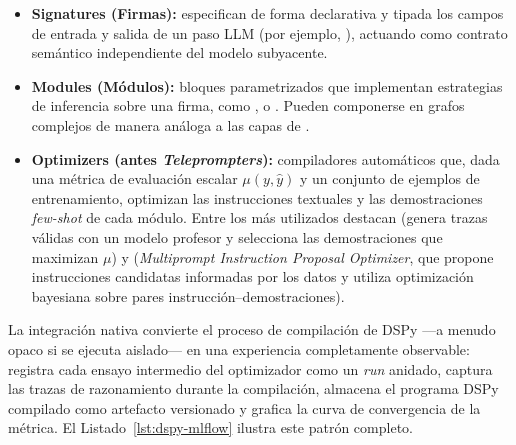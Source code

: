 \begin{itemize}
  \item \textbf{Signatures (Firmas):} especifican de forma declarativa y tipada los campos de entrada y salida de un paso LLM (por ejemplo, ), actuando como contrato semántico independiente del modelo subyacente.
  \item \textbf{Modules (Módulos):} bloques parametrizados que implementan estrategias de inferencia sobre una firma, como ,  o . Pueden componerse en grafos complejos de manera análoga a las capas de .
  \item \textbf{Optimizers (antes \textit{Teleprompters}):} compiladores automáticos que, dada una métrica de evaluación escalar $\mu(y, \hat{y})$ y un conjunto de ejemplos de entrenamiento, optimizan las instrucciones textuales y las demostraciones \textit{few-shot} de cada módulo. Entre los más utilizados destacan  (genera trazas válidas con un modelo profesor y selecciona las demostraciones que maximizan $\mu$) y  (\textit{Multiprompt Instruction Proposal Optimizer}, que propone instrucciones candidatas informadas por los datos y utiliza optimización bayesiana sobre pares instrucción--demostraciones).
\end{itemize}

La integración nativa  convierte el proceso de compilación de DSPy ---a menudo opaco si se ejecuta aislado--- en una experiencia completamente observable: registra cada ensayo intermedio del optimizador como un \textit{run} anidado, captura las trazas de razonamiento durante la compilación, almacena el programa DSPy compilado como artefacto versionado y grafica la curva de convergencia de la métrica. El Listado~\ref{lst:dspy-mlflow} ilustra este patrón completo.

